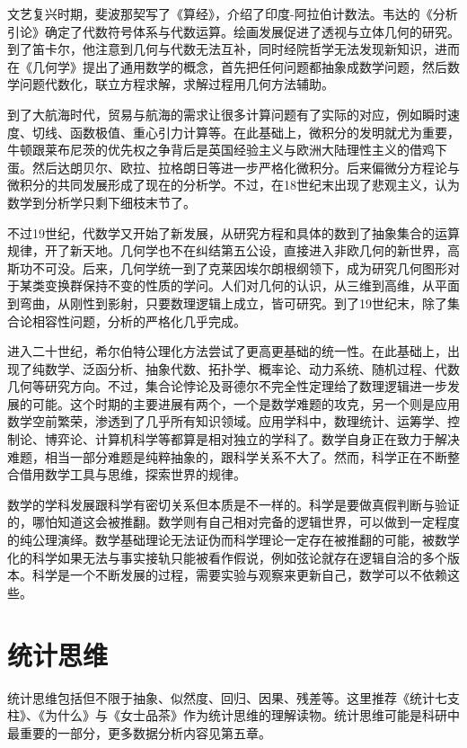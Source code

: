 \documentclass[]{tufte-book}
\begin{document}
文艺复兴时期，斐波那契写了《算经》，介绍了印度-阿拉伯计数法。韦达的《分析引论》确定了代数符号体系与代数运算。绘画发展促进了透视与立体几何的研究。到了笛卡尔，他注意到几何与代数无法互补，同时经院哲学无法发现新知识，进而在《几何学》提出了通用数学的概念，首先把任何问题都抽象成数学问题，然后数学问题代数化，联立方程求解，求解过程用几何方法辅助。

到了大航海时代，贸易与航海的需求让很多计算问题有了实际的对应，例如瞬时速度、切线、函数极值、重心引力计算等。在此基础上，微积分的发明就尤为重要，牛顿跟莱布尼茨的优先权之争背后是英国经验主义与欧洲大陆理性主义的借鸡下蛋。然后达朗贝尔、欧拉、拉格朗日等进一步严格化微积分。后来偏微分方程论与微积分的共同发展形成了现在的分析学。不过，在18世纪末出现了悲观主义，认为数学到分析学只剩下细枝末节了。

不过19世纪，代数学又开始了新发展，从研究方程和具体的数到了抽象集合的运算规律，开了新天地。几何学也不在纠结第五公设，直接进入非欧几何的新世界，高斯功不可没。后来，几何学统一到了克莱因埃尔朗根纲领下，成为研究几何图形对于某类变换群保持不变的性质的学问。人们对几何的认识，从三维到高维，从平面到弯曲，从刚性到影射，只要数理逻辑上成立，皆可研究。到了19世纪末，除了集合论相容性问题，分析的严格化几乎完成。

进入二十世纪，希尔伯特公理化方法尝试了更高更基础的统一性。在此基础上，出现了纯数学、泛函分析、抽象代数、拓扑学、概率论、动力系统、随机过程、代数几何等研究方向。不过，集合论悖论及哥德尔不完全性定理给了数理逻辑进一步发展的可能。这个时期的主要进展有两个，一个是数学难题的攻克，另一个则是应用数学空前繁荣，渗透到了几乎所有知识领域。应用学科中，数理统计、运筹学、控制论、博弈论、计算机科学等都算是相对独立的学科了。数学自身正在致力于解决难题，相当一部分难题是纯粹抽象的，跟科学关系不大了。然而，科学正在不断整合借用数学工具与思维，探索世界的规律。

数学的学科发展跟科学有密切关系但本质是不一样的。科学是要做真假判断与验证的，哪怕知道这会被推翻。数学则有自己相对完备的逻辑世界，可以做到一定程度的纯公理演绎。数学基础理论无法证伪而科学理论一定存在被推翻的可能，被数学化的科学如果无法与事实接轨只能被看作假说，例如弦论就存在逻辑自洽的多个版本。科学是一个不断发展的过程，需要实验与观察来更新自己，数学可以不依赖这些。

\hypertarget{ux7edfux8ba1ux601dux7ef4}{%
\section{统计思维}\label{ux7edfux8ba1ux601dux7ef4}}

统计思维包括但不限于抽象、似然度、回归、因果、残差等。这里推荐《统计七支柱》、《为什么》与《女士品茶》作为统计思维的理解读物。统计思维可能是科研中最重要的一部分，更多数据分析内容见第五章。
\end{document}
